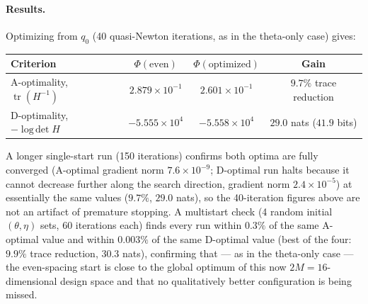 \documentclass[11pt,a4paper]{article}
\newcommand{\tr}{\operatorname{tr}}
\newcommand{\logdet}{\operatorname{log\,det}}
\begin{document}
\paragraph{Results.} Optimizing from $q_0$ (40 quasi-Newton iterations, as in the theta-only case)
gives:
\begin{center}
\begin{tabular}{lccc}
\hline
Criterion & $\Phi(\text{even})$ & $\Phi(\text{optimized})$ & Gain \\
\hline
A-optimality, $\tr(H^{-1})$ & $2.879 \times 10^{-1}$ & $2.601 \times 10^{-1}$ & $9.7\%$ trace reduction \\
D-optimality, $-\logdet H$ & $-5.555 \times 10^{4}$ & $-5.558 \times 10^{4}$ & $29.0$ nats ($41.9$ bits) \\
\hline
\end{tabular}
\end{center}
A longer single-start run (150 iterations) confirms both optima are fully converged (A-optimal
gradient norm $7.6\times10^{-9}$; D-optimal run halts because it cannot decrease further along the
search direction, gradient norm $2.4\times10^{-5}$) at essentially the same values ($9.7\%$,
$29.0$ nats), so the 40-iteration figures above are not an artifact of premature stopping. A
multistart check (4 random initial $(\theta,\eta)$ sets, 60 iterations each) finds every run within
$0.3\%$ of the same A-optimal value and within $0.003\%$ of the same D-optimal value (best of the
four: $9.9\%$ trace reduction, $30.3$ nats), confirming that --- as in the theta-only case --- the
even-spacing start is close to the global optimum of this now $2M=16$-dimensional design space and
that no qualitatively better configuration is being missed.
\end{document}
